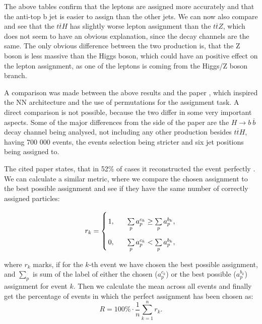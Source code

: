 \documentclass{ctuthesis}
\begin{document}
The above tables confirm that the leptons are assigned more accurately and that the anti-top b jet is easier to assign than the other jets. We can now also compare and see that the $t\overline{t}H$ has slightly worse lepton assignment than the $t\overline{t}Z$, which does not seem to have an obvious explanation, since the decay channels are the same. The only obvious difference between the two production is, that the Z boson is less massive than the Higgs boson, which could have an positive effect on the lepton assignment, as one of the leptons is coming from the Higgs/Z boson branch.

A comparison was made between the above results and the paper \cite{parton_assignment}, which inspired the NN architecture and the use of permutations for the assignment task. A direct comparison is not possible, because the two differ in some very important aspects. Some of the major differences from the side of the paper are the $H \rightarrow b\:\overline{b}$ decay channel being analysed, not including any other production besides $t\overline{t}H$, having 700 000 events, the events selection being stricter and six jet positions being assigned to.

The cited paper states, that in 52\% of cases it reconstructed the event perfectly \cite{parton_assignment}. We can calculate a similar metric, where we compare the chosen assignment to the best possible assignment and see if they have the same number of correctly assigned particles:

\begin{equation}
\arraycolsep=1.4pt\def\arraystretch{2.2}
    r_{k}= \left\{
    \begin{array}{ll}
          1, \;\;\;\;\;\;& \sum\limits_{p} a_p^{c_k} \geq \sum\limits_{p} a_p^{b_k}, \\
          0, \;\;\;\;\;\;& \sum\limits_{p} a_p^{c_k} < \sum\limits_{p} a_p^{b_k}, \\
    \end{array} \right.
\end{equation}

where $r_k$ marks, if for the $k$-th event we have chosen the best possible assignment, and $\sum\limits_{p}$ is sum of the label of either the chosen ($a_p^{c_k}$) or the best possible ($a_p^{b_k}$) assignment for event $k$. Then we calculate the mean across all events and finally get the percentage of events in which the perfect assignment has been chosen as:
\begin{equation}
    R = 100\%\cdot \frac{1}{n} \sum_{k=1}^{n} r_k.
\end{equation}
\end{document}
